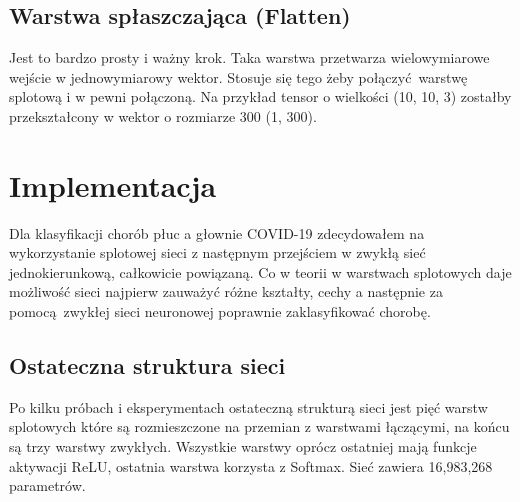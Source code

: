 \documentclass{article}
\begin{document}
\subsection{Warstwa spłaszczająca (Flatten)}
Jest to bardzo prosty i ważny krok. Taka warstwa przetwarza wielowymiarowe wejście w jednowymiarowy wektor. Stosuje się tego żeby połączyć warstwę splotową i w pewni połączoną. Na przykład tensor o wielkości (10, 10, 3) zostałby przekształcony w wektor o rozmiarze 300 (1, 300). \cite{jak_dziawaja_cnn}

\section{Implementacja}
Dla klasyfikacji chorób płuc a głownie COVID-19 zdecydowałem na wykorzystanie splotowej sieci z następnym przejściem w zwykłą sieć jednokierunkową, całkowicie powiązaną. Co w teorii w warstwach splotowych daje możliwość sieci najpierw zauważyć różne kształty, cechy a następnie za pomocą zwykłej sieci neuronowej poprawnie zaklasyfikować chorobę.

\subsection{Ostateczna struktura sieci}
Po kilku próbach i eksperymentach ostateczną strukturą sieci jest pięć warstw splotowych które są rozmieszczone na przemian z warstwami łączącymi, na końcu są trzy warstwy zwykłych. Wszystkie warstwy oprócz ostatniej mają funkcje aktywacji ReLU, ostatnia warstwa korzysta z Softmax. Sieć zawiera 16,983,268 parametrów.\\
\end{document}
